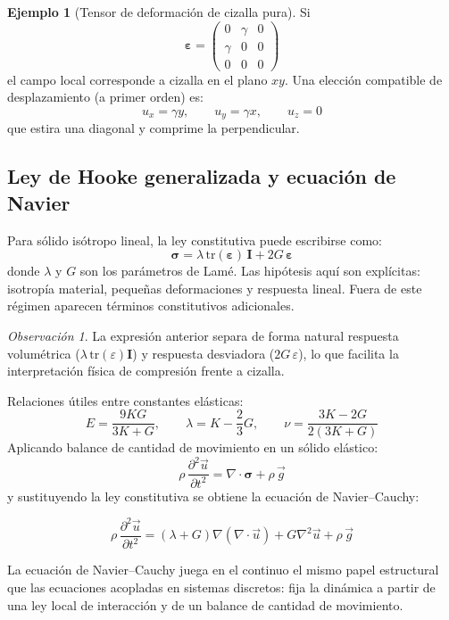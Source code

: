 \documentclass[12pt, a4paper]{article}
\theoremstyle{plain}
\theoremstyle{definition}
\newtheorem{ejemplo}{Ejemplo}[section]
\theoremstyle{remark}
\newtheorem*{observacion}{Observación}
\newcommand{\ve}[1]{\vec{#1}}
\begin{document}
\begin{ejemplo}[Tensor de deformación de cizalla pura]
Si
\begin{equation}
  \boldsymbol{\varepsilon}=
  \begin{pmatrix}
    0 & \gamma & 0\\
    \gamma & 0 & 0\\
    0 & 0 & 0
  \end{pmatrix}
\end{equation}
el campo local corresponde a cizalla en el plano $xy$. Una elección compatible de
desplazamiento (a primer orden) es:
\begin{equation}
  u_x=\gamma y,\qquad u_y=\gamma x,\qquad u_z=0
\end{equation}
que estira una diagonal y comprime la perpendicular.
\end{ejemplo}

\subsection{Ley de Hooke generalizada y ecuación de Navier}

Para sólido isótropo lineal, la ley constitutiva puede escribirse como:
\begin{equation}
  \boldsymbol{\sigma} = \lambda\,\mathrm{tr}(\boldsymbol{\varepsilon})\,\mathbf{I}
  + 2G\,\boldsymbol{\varepsilon}
\end{equation}
donde $\lambda$ y $G$ son los parámetros de Lamé.
Las hipótesis aquí son explícitas: isotropía material, pequeñas deformaciones y respuesta
lineal. Fuera de este régimen aparecen términos constitutivos adicionales.
\begin{observacion}
La expresión anterior separa de forma natural respuesta volumétrica
($\lambda\,\mathrm{tr}(\varepsilon)\mathbf{I}$) y respuesta desviadora
($2G\,\varepsilon$), lo que facilita la interpretación física de compresión frente a cizalla.
\end{observacion}

Relaciones útiles entre constantes elásticas:
\begin{equation}
  E=\frac{9KG}{3K+G},\qquad
  \lambda=K-\frac{2}{3}G,\qquad
  \nu=\frac{3K-2G}{2(3K+G)}
\end{equation}
Aplicando balance de cantidad de movimiento en un sólido elástico:
\begin{equation}
  \rho\,\frac{\partial^2\ve{u}}{\partial t^2}
  = \nabla\cdot\boldsymbol{\sigma} + \rho\,\ve{g}
\end{equation}
y sustituyendo la ley constitutiva se obtiene la ecuación de Navier--Cauchy:
\begin{mdframed}[style=resultado]
\begin{equation}
  \rho\,\frac{\partial^2\ve{u}}{\partial t^2}
  = (\lambda+G)\nabla(\nabla\cdot\ve{u}) + G\nabla^2\ve{u} + \rho\,\ve{g}
\end{equation}
\end{mdframed}
La ecuación de Navier--Cauchy juega en el continuo el mismo papel estructural que las
ecuaciones acopladas en sistemas discretos: fija la dinámica a partir de una ley local de
interacción y de un balance de cantidad de movimiento.
\end{document}
